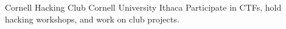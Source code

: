 \documentclass[10pt,a4paper,sans]{moderncv}        %
\begin{document}
{Cornell Hacking Club}
{Cornell University}
{Ithaca}
{}
{Participate in CTFs, hold hacking workshops, and work on club projects.\newline}

\end{document}

